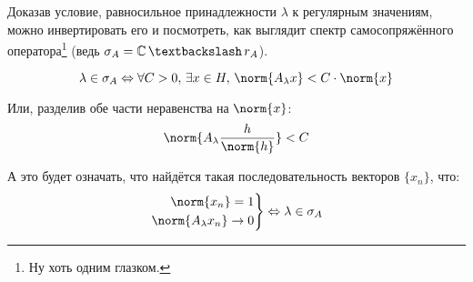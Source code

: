 	Доказав условие, равносильное принадлежности $\lambda$ к регулярным значениям, можно инвертировать его и посмотреть,
	как выглядит спектр самосопряжённого оператора\footnote{Ну хоть одним глазком.} 
	(ведь $\sigma_A = \mathbb{C} \,\textbackslash\, r_A$).
	
	$$\lambda \in \sigma_A \Leftrightarrow \forall C > 0,\, \exists x \in H,\, \norm{A_{\lambda}x} < C\cdot\norm{x}$$
	
	Или, разделив обе части неравенства на $\norm{x}$:
	$$\norm{A_{\lambda} \dfrac{h}{\norm{h}}} < C$$
	
	А это будет означать, что найдётся такая последовательность векторов $\{x_n\}$, что:
	$$
		\left.
		\begin{aligned}
			\norm{x_n} = 1 \\
			\norm{A_{\lambda}x_n} \rightarrow 0
		\end{aligned}
		\right\}
		\Leftrightarrow
		\lambda \in \sigma_A
	$$
